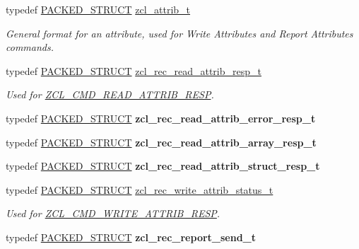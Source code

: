 \begin{DoxyCompactItemize}
typedef \hyperlink{group___s_x_a_ga4233297bd31be5c273d4fb0758cc54d7}{P\+A\+C\+K\+E\+D\+\_\+\+S\+T\+R\+U\+CT} \hyperlink{group__zcl_ga2373217b6694c1cb1a99113c24519a73}{zcl\+\_\+attrib\+\_\+t}
\begin{DoxyCompactList}\small\item\em General format for an attribute, used for Write Attributes and Report Attributes commands. \end{DoxyCompactList}\item 
typedef \hyperlink{group___s_x_a_ga4233297bd31be5c273d4fb0758cc54d7}{P\+A\+C\+K\+E\+D\+\_\+\+S\+T\+R\+U\+CT} \hyperlink{group__zcl_ga4d098e33e67cdba2f8a968ff66471cfb}{zcl\+\_\+rec\+\_\+read\+\_\+attrib\+\_\+resp\+\_\+t}
\begin{DoxyCompactList}\small\item\em Used for \hyperlink{group__zcl_ga85ca2068c5dc26db307b60b0ac54bc9c}{Z\+C\+L\+\_\+\+C\+M\+D\+\_\+\+R\+E\+A\+D\+\_\+\+A\+T\+T\+R\+I\+B\+\_\+\+R\+E\+SP}. \end{DoxyCompactList}\item 
typedef \hyperlink{group___s_x_a_ga4233297bd31be5c273d4fb0758cc54d7}{P\+A\+C\+K\+E\+D\+\_\+\+S\+T\+R\+U\+CT} {\bfseries zcl\+\_\+rec\+\_\+read\+\_\+attrib\+\_\+error\+\_\+resp\+\_\+t}
\item 
typedef \hyperlink{group___s_x_a_ga4233297bd31be5c273d4fb0758cc54d7}{P\+A\+C\+K\+E\+D\+\_\+\+S\+T\+R\+U\+CT} {\bfseries zcl\+\_\+rec\+\_\+read\+\_\+attrib\+\_\+array\+\_\+resp\+\_\+t}
\item 
typedef \hyperlink{group___s_x_a_ga4233297bd31be5c273d4fb0758cc54d7}{P\+A\+C\+K\+E\+D\+\_\+\+S\+T\+R\+U\+CT} {\bfseries zcl\+\_\+rec\+\_\+read\+\_\+attrib\+\_\+struct\+\_\+resp\+\_\+t}
\item 
typedef \hyperlink{group___s_x_a_ga4233297bd31be5c273d4fb0758cc54d7}{P\+A\+C\+K\+E\+D\+\_\+\+S\+T\+R\+U\+CT} \hyperlink{group__zcl_ga22e48ce5d4bb199b52f155f53e396f87}{zcl\+\_\+rec\+\_\+write\+\_\+attrib\+\_\+status\+\_\+t}
\begin{DoxyCompactList}\small\item\em Used for \hyperlink{group__zcl_ga0595c0f6957be4e80265ecd36158c0ae}{Z\+C\+L\+\_\+\+C\+M\+D\+\_\+\+W\+R\+I\+T\+E\+\_\+\+A\+T\+T\+R\+I\+B\+\_\+\+R\+E\+SP}. \end{DoxyCompactList}\item 
typedef \hyperlink{group___s_x_a_ga4233297bd31be5c273d4fb0758cc54d7}{P\+A\+C\+K\+E\+D\+\_\+\+S\+T\+R\+U\+CT} {\bfseries zcl\+\_\+rec\+\_\+report\+\_\+send\+\_\+t}
\item 

\end{DoxyCompactItemize}

